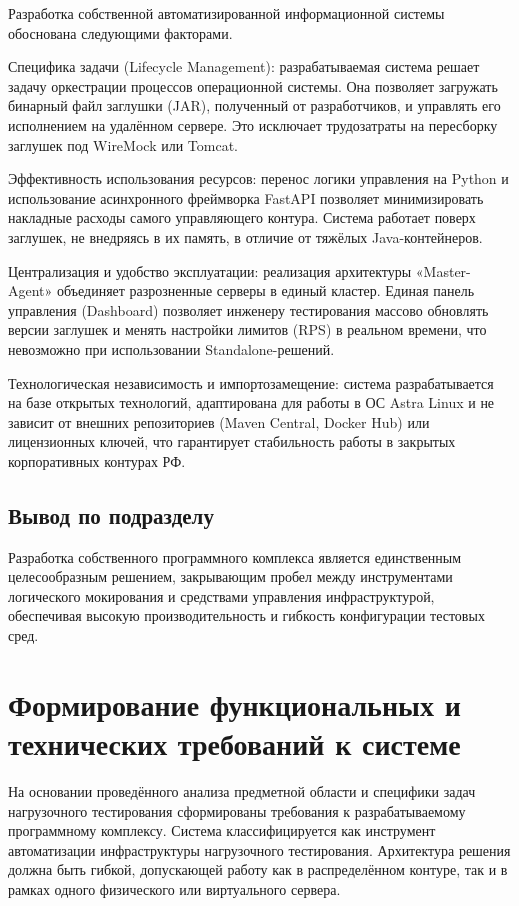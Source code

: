 Разработка собственной автоматизированной информационной системы обоснована следующими факторами.

Специфика задачи (Lifecycle Management): разрабатываемая система решает задачу оркестрации процессов операционной системы. Она позволяет загружать бинарный файл заглушки (JAR), полученный от разработчиков, и управлять его исполнением на удалённом сервере. Это исключает трудозатраты на пересборку заглушек под WireMock или Tomcat.

Эффективность использования ресурсов: перенос логики управления на Python и использование асинхронного фреймворка FastAPI позволяет минимизировать накладные расходы самого управляющего контура. Система работает поверх заглушек, не внедряясь в их память, в отличие от тяжёлых Java-контейнеров.

Централизация и удобство эксплуатации: реализация архитектуры «Master-Agent» объединяет разрозненные серверы в единый кластер. Единая панель управления (Dashboard) позволяет инженеру тестирования массово обновлять версии заглушек и менять настройки лимитов (RPS) в реальном времени, что невозможно при использовании Standalone-решений.

Технологическая независимость и импортозамещение: система разрабатывается на базе открытых технологий, адаптирована для работы в ОС Astra Linux и не зависит от внешних репозиториев (Maven Central, Docker Hub) или лицензионных ключей, что гарантирует стабильность работы в закрытых корпоративных контурах РФ.

\subsection {Вывод по подразделу}

Разработка собственного программного комплекса является единственным целесообразным решением, закрывающим пробел между инструментами логического мокирования и средствами управления инфраструктурой, обеспечивая высокую производительность и гибкость конфигурации тестовых сред.

\section{Формирование функциональных и технических требований к системе}

На основании проведённого анализа предметной области и специфики задач нагрузочного тестирования сформированы требования к разрабатываемому программному комплексу. Система классифицируется как инструмент автоматизации инфраструктуры нагрузочного тестирования. Архитектура решения должна быть гибкой, допускающей работу как в распределённом контуре, так и в рамках одного физического или виртуального сервера.


